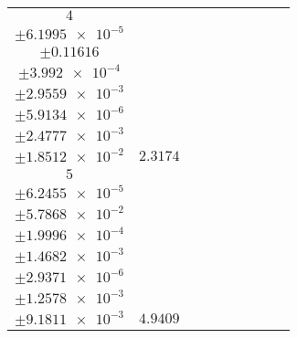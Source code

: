 \documentclass[8pt]{article}
\begin{document}
\begin{longtable}[l]{c c c c c c c c c}
$\num{4}$ & \begin{tabular}[c]{@{}c@{}}$\num{3.0811e-2}$ \\ $\pm\num{6.1995e-5}$\end{tabular} & \begin{tabular}[c]{@{}c@{}}$\num{0.65548}$ \\ $\pm\num{0.11616}$\end{tabular} & \begin{tabular}[c]{@{}c@{}}$\num{1.9082}$ \\ $\pm\num{3.992e-4}$\end{tabular} & \begin{tabular}[c]{@{}c@{}}$\num{639.71}$ \\ $\pm\num{2.9559e-3}$\end{tabular} & \begin{tabular}[c]{@{}c@{}}$\num{1.2798}$ \\ $\pm\num{5.9134e-6}$\end{tabular} & \begin{tabular}[c]{@{}c@{}}$\num{1.1664}$ \\ $\pm\num{2.4777e-3}$\end{tabular} & \begin{tabular}[c]{@{}c@{}}$\num{4.2597}$ \\ $\pm\num{1.8512e-2}$\end{tabular} & $\num{2.3174}$\\
$\num{5}$ & \begin{tabular}[c]{@{}c@{}}$\num{6.2105e-2}$ \\ $\pm\num{6.2455e-5}$\end{tabular} & \begin{tabular}[c]{@{}c@{}}$\num{0.50518}$ \\ $\pm\num{5.7868e-2}$\end{tabular} & \begin{tabular}[c]{@{}c@{}}$\num{5.2037}$ \\ $\pm\num{1.9996e-4}$\end{tabular} & \begin{tabular}[c]{@{}c@{}}$\num{643}$ \\ $\pm\num{1.4682e-3}$\end{tabular} & \begin{tabular}[c]{@{}c@{}}$\num{1.2863}$ \\ $\pm\num{2.9371e-6}$\end{tabular} & \begin{tabular}[c]{@{}c@{}}$\num{1.1837}$ \\ $\pm\num{1.2578e-3}$\end{tabular} & \begin{tabular}[c]{@{}c@{}}$\num{4.1873}$ \\ $\pm\num{9.1811e-3}$\end{tabular} & $\num{4.9409}$\\

\end{longtable}
\end{document}
